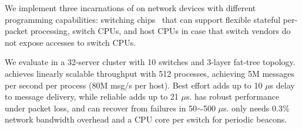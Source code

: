 
We implement three incarnations of \sys on network devices with different programming capabilities:  switching chips~\cite{tofino,cavium} that can support flexible stateful per-packet processing, switch CPUs, and host CPUs in case that switch vendors do not expose accesses to switch CPUs.



We evaluate \sys in a 32-server cluster with 10 switches and 3-layer fat-tree topology.
\sys{} achieves linearly scalable throughput with 512 processes, achieving 5M messages per second per process (80M msg/s per host).
Best effort \sys{} adds up to 10 $\mu$s delay to message delivery, while reliable \sys{} adds up to 21 $\mu$s.
\sys{} has robust performance under packet loss, and can recover from failures in 50$\sim$500 $\mu$s.
\sys{} only needs 0.3\% network bandwidth overhead and a CPU core per switch for periodic beacons.

